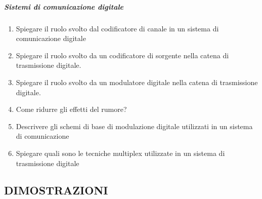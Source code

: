 \documentclass[
]{article}
\providecommand{\tightlist}{%
  \setlength{\itemsep}{0pt}\setlength{\parskip}{0pt}}
\begin{document}
\subparagraph{Sistemi di comunicazione
digitale}\label{sistemi-di-comunicazione-digitale}

\begin{enumerate}
\def\labelenumi{\arabic{enumi}.}
\setcounter{enumi}{42}
\tightlist
\item
  Spiegare il ruolo svolto dal codificatore di canale in un sistema di
  comunicazione digitale
\item
  Spiegare il ruolo svolto da un codificatore di sorgente nella catena
  di trasmissione digitale.
\item
  Spiegare il ruolo svolto da un modulatore digitale nella catena di
  trasmissione digitale.
\item
  Come ridurre gli effetti del rumore?
\item
  Descrivere gli schemi di base di modulazione digitale utilizzati in un
  sistema di comunicazione
\item
  Spiegare quali sono le tecniche multiplex utilizzate in un sistema di
  trasmissione digitale
\end{enumerate}

\subsection{DIMOSTRAZIONI}\label{dimostrazioni}
\end{document}
